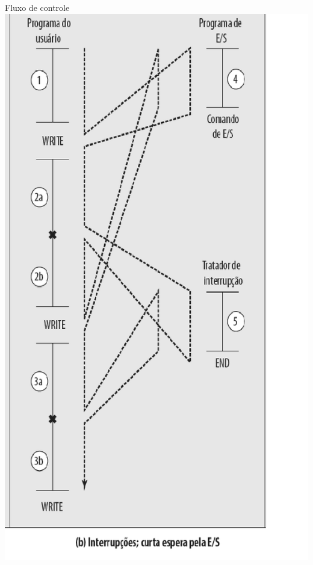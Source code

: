 \begin{slide}{Fluxo de controle}
   \includegraphics[height=0.8\textheight]{figs/int02.eps}
   \pause

\end{slide}
